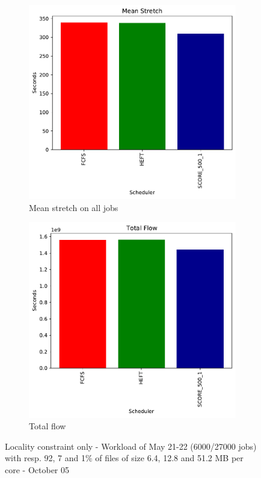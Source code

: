 \documentclass[a4paper]{article}
\begin{document}
\begin{figure}[H]
\begin{subfigure}[b]{0.4\linewidth}\centering\includegraphics[width=0.9\linewidth]{MBSS/plot/Results_FCFS_Score_Adaptative_Multiplier_2022-05-21->2022-05-22_V9271_Mean_Stretch_450_128_32_256_4_1024.pdf}\caption{Mean stretch on all jobs}\end{subfigure}
\begin{subfigure}[b]{0.4\linewidth}\centering\includegraphics[width=0.9\linewidth]{MBSS/plot/Results_FCFS_Score_Adaptative_Multiplier_2022-05-21->2022-05-22_V9271_Total_flow_450_128_32_256_4_1024.pdf}\caption{Total flow}\end{subfigure}
\caption{Locality constraint only - Workload of May 21-22 (6000/27000 jobs) with resp. 92, 7 and 1\% of files of size 6.4, 12.8 and 51.2 MB per core - October 05}\end{figure}
\end{document}
